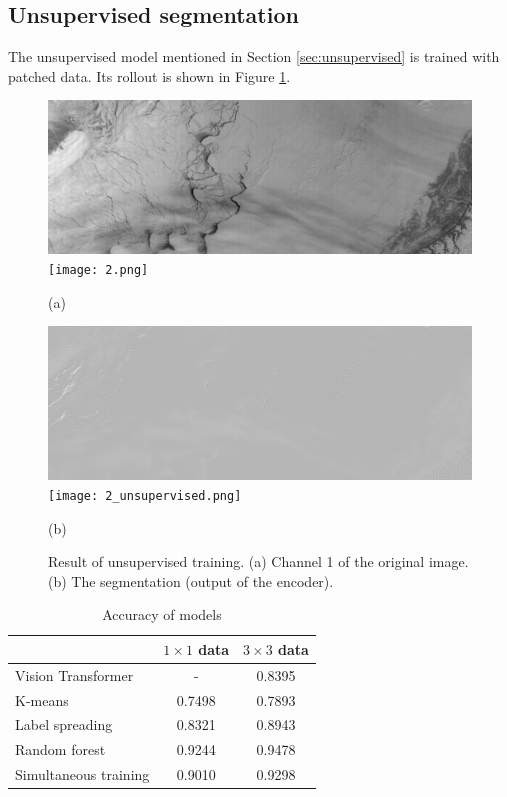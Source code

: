 \documentclass{article}
\begin{document}
    \subsection{Unsupervised segmentation}
        The unsupervised model mentioned in Section \ref{sec:unsupervised}
        is trained with patched data.
        Its rollout is shown in Figure \ref{fig:unsupervised}.

        \begin{figure}[ht]
            \centering
            \begin{minipage}{0.49\hsize}
                \centering
                \includegraphics[width = 1\hsize]{1.png}
                \texttt{[image: 2.png]}
                \caption*{(a)}
            \end{minipage}
            \begin{minipage}{0.49\hsize}
                \centering
                \includegraphics[width = 1\hsize]{1_unsupervised.png}
                \texttt{[image: 2\_unsupervised.png]}
                \caption*{(b)}
            \end{minipage}
            \caption{
                Result of unsupervised training.
                (a) Channel 1 of the original image.
                (b) The segmentation (output of the encoder).
            }
            \label{fig:unsupervised}
        \end{figure}

    \begin{table}
        \centering
        \caption{Accuracy of models}
        \label{tab:accuracy}
        \begin{tabular}{l|cc} \hline
            & $1\times 1$ data & $3\times 3$ data \\ \hline
            Vision Transformer & - & 0.8395 \\
            K-means & 0.7498 & 0.7893 \\
            Label spreading & 0.8321 & 0.8943 \\
            Random forest & 0.9244 & 0.9478 \\
            Simultaneous training & 0.9010 & 0.9298 \\ \hline
        \end{tabular}
    \end{table}
\end{document}
